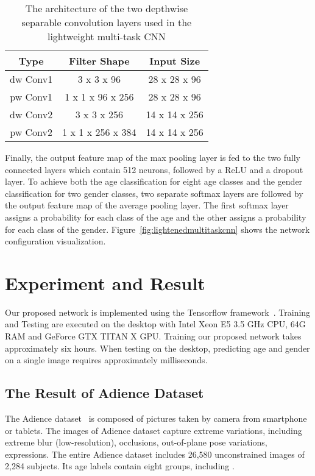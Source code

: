\documentclass[times, 10pt,twocolumn]{article}
\begin{document}
\begin{table}[]
\centering
\caption{The architecture of the two depthwise separable convolution layers used in the lightweight multi-task CNN}
\label{tab:depthwiseconvolutions1}
\begin{tabular}{@{}ccc@{}}
\toprule
Type      & Filter Shape        & Input Size     \\ \midrule
dw Conv1  & 3 x 3 x 96          & 28 x 28 x 96 \\
pw Conv1  & 1 x 1 x 96 x 256     & 28 x 28 x 96 \\
dw Conv2  & 3 x 3 x 256          & 14 x 14 x 256 \\
pw Conv2  & 1 x 1 x 256 x 384    & 14 x 14 x 256   \\ \bottomrule
\end{tabular}
\end{table}

Finally, the output feature map of the max pooling layer is fed to the two fully connected layers which contain 512 neurons, followed by a ReLU and a dropout layer. To achieve both the age classification for eight age classes and the gender classification for two gender classes, two separate softmax layers are followed by the output feature map of the average pooling layer. The first softmax layer assigns a probability for each class of the age and the other assigns a probability for each class of the gender. 
Figure~\ref{fig:lightenedmultitaskcnn} shows the network configuration visualization.

\section{Experiment and Result} \label{sec:experimentresult}
Our proposed network is implemented using the Tensorflow framework~\cite{abadi2016tensorflow}. Training and Testing are executed on the desktop with Intel Xeon E5 3.5 GHz CPU, 64G RAM and GeForce GTX TITAN X GPU. Training our proposed network takes approximately six hours. When testing on the desktop, predicting age and gender on a single image requires approximately  milliseconds.

\subsection{The Result of Adience Dataset}
The Adience dataset~\cite{eidinger2014age} is composed of pictures taken by camera from smartphone or tablets. 
The images of Adience dataset capture extreme variations, including extreme blur (low-resolution), occlusions, out-of-plane pose variations, expressions. 
The entire Adience dataset includes 26,580 unconstrained images of 2,284 subjects. 
Its age labels contain eight groups, including .
\end{document}
